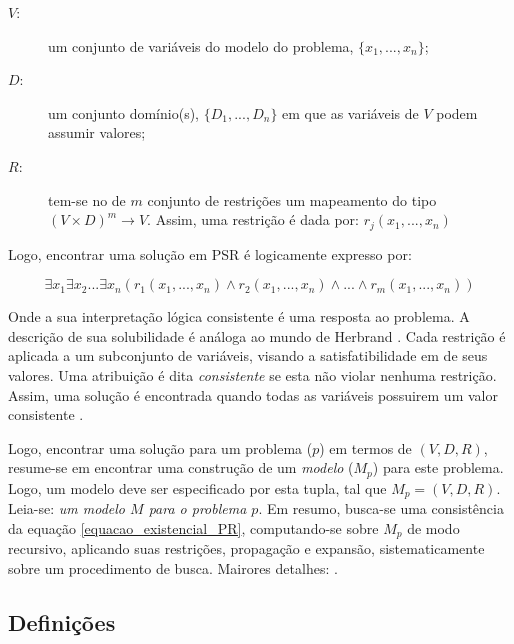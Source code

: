 
\begin{description}
\item[$V$:] um conjunto de variáveis do modelo do problema, $\{ x_{1}, ... , x_{n} \}$;

\item[$D$:] um conjunto domínio(s), $\{ D_{1},...,D_{n} \}$ em que as variáveis de $V$ podem assumir valores;

\item[$R$:] tem-se no de $m$ conjunto de restrições  um mapeamento do tipo $(V \times D)^m \rightarrow V$.
 	     Assim, uma restriç\~ao é dada por: $r_j(x_1, ... , x_n)$ 
\end{description}

Logo, encontrar uma soluç\~ao em PSR é logicamente expresso por:

\begin{equation}
\exists x_1 \exists x_2 ... \exists x_n (r_1(x_1, ... , x_n) \wedge r_2(x_1, ... , x_n) \wedge ... \wedge r_m(x_1, ... , x_n) )  
\label{equacao_existencial_PR}
\end{equation}

Onde a sua interpretação lógica consistente é uma resposta ao problema. A descrição
de sua solubilidade é análoga ao mundo de Herbrand \cite{chang-lee73, nilsson00}.  Cada restrição é aplicada a um subconjunto de variáveis, visando a satisfatibilidade em de  seus valores. Uma atribuição é dita \textit{consistente} se esta não violar nenhuma restrição. Assim,  uma solução é encontrada quando todas as variáveis possuirem um valor consistente \cite{RusNorv2010}.



Logo, encontrar uma solução para um problema ($p$) em termos de $(V, D, R)$, resume-se em encontrar uma construção
de um {\em modelo} ($M_p$) para este problema. Logo, 
um modelo deve ser especificado por esta tupla, tal que  
$M_p = (V, D, R)$. Leia-se: {\em um modelo {\bf $M$} para o problema {\bf $p$}}.
Em resumo, busca-se uma consistência da equação \ref{equacao_existencial_PR}, 
computando-se sobre $M_p$ de modo
recursivo,  aplicando suas  restrições, propagação e expansão, sistematicamente sobre um procedimento de busca. Mairores detalhes:  \cite{apt_2003}.


\subsection{Definições} %
\label{subsec_def}


